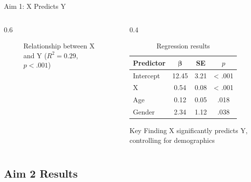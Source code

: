 \documentclass[aspectratio=169,11pt]{beamer}
\begin{document}
\begin{frame}{Aim 1: X Predicts Y}
  \begin{columns}[c]
    
    \begin{column}{0.6\textwidth}
      \begin{figure}
        \centering
        \caption{Relationship between X and Y ($R^2 = 0.29$, $p < .001$)}
      \end{figure}
    \end{column}
    
    \begin{column}{0.4\textwidth}
      \begin{table}
        \centering
        \caption{Regression results}
        \tiny
        \begin{tabular}{lccc}
          \toprule
          \textbf{Predictor} & $\boldsymbol{\beta}$ & \textbf{SE} & \textbf{$p$} \\
          \midrule
          Intercept & 12.45 & 3.21 & < .001 \\
          X & 0.54 & 0.08 & < .001 \\
          Age & 0.12 & 0.05 & .018 \\
          Gender & 2.34 & 1.12 & .038 \\
          \bottomrule
        \end{tabular}
      \end{table}
      
      \vspace{0.3cm}
      
      \begin{block}{Key Finding}
        X significantly predicts Y, controlling for demographics
      \end{block}
    \end{column}
    
  \end{columns}
\end{frame}

\subsection{Aim 2 Results}
\end{document}
